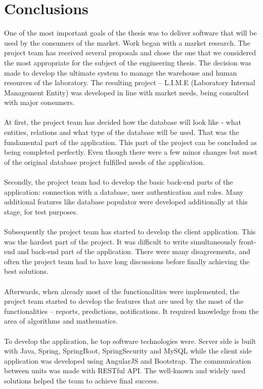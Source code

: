 \documentclass[a4paper,11pt,twoside]{report}
\theoremstyle{definition}
\begin{document}
\chapter*{Conclusions}


One of the most important goals of the thesis was to deliver software that will be used by the consumers of the market. Work began with a market research. The project team has received several proposals and chose the one that we considered the most appropriate for the subject of the engineering thesis. The decision was made to develop the ultimate system to manage the warehouse and human resources of the laboratory. The resulting project – L.I.M.E (Laboratory Internal Management Entity) was developed in line with market needs, being consulted with major consumers.\\ \\
At first, the project team has decided how the database will look like - what entities, relations and what type of the database will be used. That was the fundamental part of the application. This part of the project can be concluded as being completed perfectly. Even though there were a few minor changes but most of the original database project fulfilled needs of the application.\\ \\
Secondly, the project team had to develop the basic back-end parts of the application: connection with a database, user authentication and roles. Many additional features like database populator were developed additionally at this stage, for test purposes. \\ \\
Subsequently the project team has started to develop the client application. This was the hardest part of the project. It was difficult to write simultaneously front-end and back-end part of the application. There were many disagreements, and often the project team had to have long discussions before finally achieving the best solutions.\\ \\
Afterwards, when already most of the functionalities were implemented, the project team started to develop the features that are used by the most of the functionalities – reports, predictions, notifications. It required knowledge from the area of algorithms and mathematics. \\ \\
To develop the application, he top software technologies were. Server side is built with Java, Spring, SpringBoot, SpringSecurity and MySQL while the client side application was developed using AngularJS and Bootstrap. The communication between units was made with RESTful API. The well-known and widely used solutions helped the team to achieve final success. \\ \\
\end{document}
